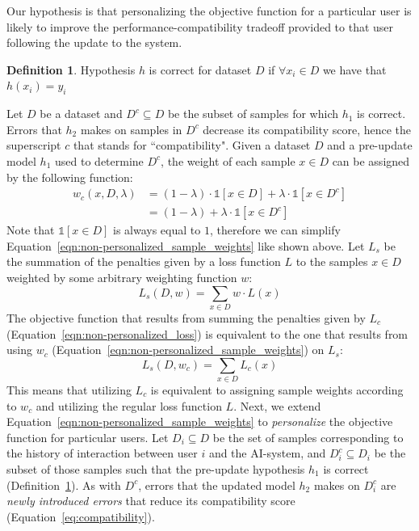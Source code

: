 \documentclass[letterpaper]{article} %
\theoremstyle{definition}
\newtheorem{definition}{Definition}
\begin{document}
Our hypothesis is that personalizing the objective function for a particular user is likely to improve the performance-compatibility tradeoff provided to that user following the update to the system.

\begin{definition}
Hypothesis  $h$  is correct for  dataset $D$ if 
$\forall x_i \in D$ we have that $h(x_i)=y_i$ 
\label{def:hypCorrect}
\end{definition}
Let $D$ be a dataset and $D^c\subseteq D$ be the subset of samples for which $h_1$ is correct. Errors that $h_2$ makes on samples in $D^c$ decrease its compatibility score, hence the superscript $c$ that stands for ``compatibility". Given a dataset $D$ and a pre-update model $h_1$ used to determine $D^c$, the weight of each sample $x\in D$ can be assigned by the following function:
%
\begin{align}
\label{eqn:non-personalized_sample_weights}
w_c(x,D,\lambda)&=(1-\lambda)\cdot\mathbb{1}[x\in D]+\lambda\cdot\mathbb{1}[x\in D^c] \\  \nonumber
&=(1-\lambda) + \lambda\cdot\mathbb{1}[x\in D^c] 
\end{align}
%
Note that $\mathbb{1}[x\in D]$ is always equal to $1$, therefore we can simplify Equation~\ref{eqn:non-personalized_sample_weights} like shown above. Let $L_s$ be the summation of the penalties given by a loss function $L$ to the samples $x\in D$ weighted by some arbitrary weighting function $w$:
\begin{equation}
\label{eqn:loss_summation}
    L_s(D,w) = \sum_{x \in D} w \cdot L(x)
\end{equation}
%
The objective function that results from summing the penalties given by $L_c$ (Equation~\ref{eqn:non-personalized_loss}) is equivalent to the one that results from using $w_c$ (Equation~\ref{eqn:non-personalized_sample_weights}) on $L_s$:
\begin{equation}
\label{eqn:Ls_equals_Lc}
    L_s(D,w_c) = \sum_{x \in D}L_c(x)
\end{equation}
%
This means that utilizing $L_c$ is equivalent to assigning sample weights according to $w_c$ and utilizing the regular loss function $L$. Next, we extend Equation~\ref{eqn:non-personalized_sample_weights} to  \textit{personalize} the objective function for  particular users. 
Let $D_i\subseteq D$ be the set of samples corresponding to the  history of interaction between user $i$ and the AI-system, and $D_i^c \subseteq D_i$ be the subset of those samples such that 
the pre-update hypothesis $h_1$ is correct (Definition~\ref{def:hypCorrect}). As with $D^c$, errors that the updated model $h_2$ makes on $D_i^c$ are \textit{newly introduced errors} that reduce its compatibility score (Equation~\ref{eq:compatibility}).
\end{document}
